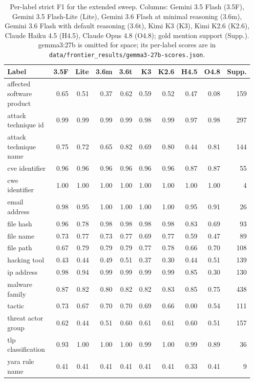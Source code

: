 \documentclass[11pt]{article}
\begin{document}
\begin{table}[t]
\centering
\footnotesize
\begin{tabular}{lrrrrrrrrr}
\toprule
Label & 3.5F & Lite & 3.6m & 3.6t & K3 & K2.6 & H4.5 & O4.8 & Supp. \\
\midrule
affected software product & 0.65 & 0.51 & 0.37 & 0.62 & 0.59 & 0.52 & 0.47 & 0.08 & 159 \\
attack technique id & 0.99 & 0.99 & 0.99 & 0.99 & 0.98 & 0.99 & 0.97 & 0.98 & 297 \\
attack technique name & 0.75 & 0.72 & 0.65 & 0.82 & 0.69 & 0.80 & 0.44 & 0.81 & 144 \\
cve identifier & 0.96 & 0.96 & 0.96 & 0.96 & 0.96 & 0.96 & 0.87 & 0.87 & 55 \\
cwe identifier & 1.00 & 1.00 & 1.00 & 1.00 & 1.00 & 1.00 & 1.00 & 1.00 & 4 \\
email address & 0.98 & 0.95 & 1.00 & 1.00 & 1.00 & 1.00 & 0.95 & 0.91 & 26 \\
file hash & 0.96 & 0.78 & 0.98 & 0.98 & 0.98 & 0.98 & 0.83 & 0.69 & 93 \\
file name & 0.73 & 0.77 & 0.73 & 0.77 & 0.69 & 0.77 & 0.59 & 0.47 & 89 \\
file path & 0.67 & 0.79 & 0.79 & 0.79 & 0.77 & 0.78 & 0.66 & 0.70 & 108 \\
hacking tool & 0.43 & 0.44 & 0.49 & 0.51 & 0.37 & 0.30 & 0.44 & 0.51 & 139 \\
ip address & 0.98 & 0.94 & 0.99 & 0.99 & 0.99 & 0.99 & 0.85 & 0.30 & 130 \\
malware family & 0.87 & 0.82 & 0.80 & 0.82 & 0.82 & 0.83 & 0.85 & 0.75 & 438 \\
tactic & 0.73 & 0.67 & 0.70 & 0.70 & 0.69 & 0.66 & 0.00 & 0.54 & 111 \\
threat actor group & 0.62 & 0.44 & 0.51 & 0.60 & 0.61 & 0.61 & 0.60 & 0.51 & 157 \\
tlp classification & 0.93 & 1.00 & 1.00 & 1.00 & 0.99 & 1.00 & 0.99 & 0.89 & 36 \\
yara rule name & 0.41 & 0.41 & 0.41 & 0.41 & 0.41 & 0.41 & 0.33 & 0.41 & 9 \\
\bottomrule
\end{tabular}
\caption{Per-label strict F1 for the extended sweep. Columns: Gemini 3.5
Flash (3.5F), Gemini 3.5 Flash-Lite (Lite), Gemini 3.6 Flash at minimal
reasoning (3.6m), Gemini 3.6 Flash with default reasoning (3.6t),
Kimi K3 (K3), Kimi K2.6 (K2.6), Claude Haiku 4.5 (H4.5), Claude Opus
4.8 (O4.8); gold mention support (Supp.).
gemma3:27b is omitted for space; its per-label scores are in
\texttt{data/frontier\_results/gemma3-27b-scores.json}.}
\label{tab:frontier-extended-perlabel}
\end{table}
\end{document}

